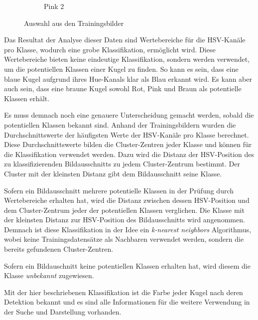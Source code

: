 \begin{figure}[h!]
\begin{subfigure}[b]{0.15\textwidth}
        \caption{Pink 2}
        \label{fig:classification_pink_ball_2}
    \end{subfigure}
    \caption{Auswahl aus den Trainingsbilder}
    \label{fig:classification_trainingdata_examples}
\end{figure}

Das Resultat der Analyse dieser Daten sind Wertebereiche für die HSV-Kanäle pro Klasse, wodurch eine grobe Klassifikation,
ermöglicht wird. Diese Wertebereiche bieten keine eindeutige Klassifikation, sondern werden verwendet, um die potentiellen
Klassen einer Kugel zu finden.
So kann es sein, dass eine blaue Kugel aufgrund ihres Hue-Kanals klar als Blau erkannt wird.
Es kann aber auch sein, dass eine braune Kugel sowohl Rot, Pink und Braun als potentielle Klassen erhält.

Es muss demnach noch eine genauere Unterscheidung gemacht werden, sobald die potentiellen Klassen bekannt sind.
Anhand der Trainingsbildern wurden die Durchschnittswerte der häufigsten Werte der HSV-Kanäle pro Klasse berechnet.
Diese Durchschnittswerte bilden die Cluster-Zentren jeder Klasse und können für die Klassifikation verwendet werden.
Dazu wird die Distanz der HSV-Position des zu klassifizierenden Bildausschnitts zu jedem Cluster-Zentrum bestimmt.
Der Cluster mit der kleinsten Distanz gibt dem Bildausschnitt seine Klasse.

Sofern ein Bildausschnitt mehrere potentielle Klassen in der Prüfung durch Wertebereiche erhalten hat, wird die Distanz
zwischen dessen HSV-Position und dem Cluster-Zentrum jeder der potentiellen Klassen verglichen.
Die Klasse mit der kleinsten Distanz zur HSV-Position des Bildausschnitts wird angenommen.
Demnach ist diese Klassifikation in der Idee ein \emph{k-nearest neighbors} Algorithmus\cite{wiki:k_nearest_neighbors},
wobei keine Trainingsdatensätze als Nachbaren verwendet werden, sondern die bereits gefundenen Cluster-Zentren.

Sofern ein Bildauschnitt keine potentiellen Klassen erhalten hat, wird diesem die Klasse \emph{unbekannt} zugewiesen.

Mit der hier beschriebenen Klassifikation ist die Farbe jeder Kugel nach deren Detektion bekannt und es
sind alle Informationen für die weitere Verwendung in der Suche und Darstellung vorhanden.
